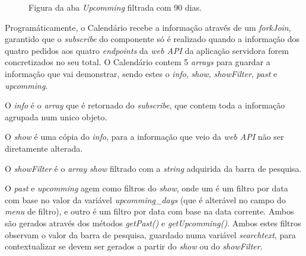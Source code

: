 \begin{figure}[h]
	\begin{center}
	\end{center}
	\caption{Figura da aba \textit{Upcomming} filtrada com 90 dias.}\label{fig:calendarfilter90days}
\end{figure}

Programáticamente, o Calendário recebe a informação através de um \textit{forkJoin}, garantido que o \textit{subscribe} do componente só é realizado quando a informação dos quatro pedidos aos quatro \textit{endpoints} da \textit{web API} da aplicação servidora forem concretizados no seu total. O Calendário contem 5 \textit{arrays} para guardar a informação que vai demonstrar, sendo estes o \textit{info}, \textit{show}, \textit{showFilter}, \textit{past} e \textit{upcomming}.

O \textit{info} é o \textit{array} que é retornado do \textit{subscribe}, que contem toda a informação agrupada num unico objeto.

O \textit{show} é uma cópia do \textit{info}, para a informação que veio da \textit{web API} não ser diretamente alterada.

O \textit{showFilter} é o \textit{array} \textit{show} filtrado com a \textit{string} adquirida da barra de pesquisa.

O \textit{past} e \textit{upcomming} agem como filtros do \textit{show}, onde um é um filtro por data com base no valor da variável \textit{upcomming\_days} (que é alterável no campo do \textit{menu} de filtro), e outro é um filtro por data com base na data corrente. Ambos são gerados através dos métodos \textit{getPast()} e \textit{getUpcomming()}. Ambos estes filtros observam o valor da barra de pesquisa, guardado numa variável \textit{searchtext}, para contextualizar se devem ser gerados a partir do \textit{show} ou do \textit{showFilter}.

